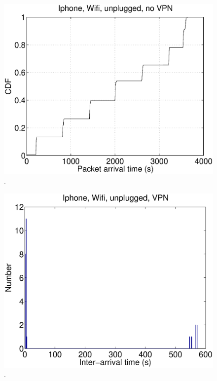 \begin{figure}
\centering
        \includegraphics[width=0.8\linewidth]{../../code/pushNotification/Fig/bw_iphone_wifi_unplug_novpn_ts.eps}
  \caption{.}
  \label{fig:}
\end{figure}

\begin{figure}
\centering
        \includegraphics[width=0.8\linewidth]{../../code/pushNotification/Fig/bw_iphone_wifi_unplug_vpn_interTs.eps}
  \caption{.}
  \label{fig:}
\end{figure}

